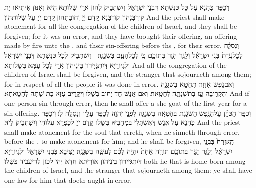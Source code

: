 {וִיכַפַּר כָּהֲנָא עַל כָּל כְּנִשְׁתָּא דִּבְנֵי יִשְׂרָאֵל וְיִשְׁתְּבֵיק לְהוֹן אֲרֵי שָׁלוּתָא הִיא וְאִנּוּן אֵיתִיאוּ יָת קוּרְבָּנְהוֹן קוּרְבָּנָא קֳדָם יְיָ וְחוֹבַתְהוֹן קֳדָם יְיָ עַל שָׁלוּתְהוֹן׃}
{And the priest shall make atonement for all the congregation of the children of Israel, and they shall be forgiven; for it was an error, and they have brought their offering, an offering made by fire unto the \lord, and their sin-offering before the \lord, for their error.}{}
{וְנִסְלַ֗ח לְכׇל\maqqaf עֲדַת֙ בְּנֵ֣י יִשְׂרָאֵ֔ל וְלַגֵּ֖ר הַגָּ֣ר בְּתוֹכָ֑ם כִּ֥י לְכׇל\maqqaf הָעָ֖ם בִּשְׁגָגָֽה׃ \setuma }
{וְיִשְׁתְּבֵיק לְכָל כְּנִשְׁתָּא דִּבְנֵי יִשְׂרָאֵל וּלְגִיּוֹרַיָּא דְּיִתְגַּיְּירוּן בֵּינֵיהוֹן אֲרֵי לְכָל עַמָּא בְּשָׁלוּתָא׃}
{And all the congregation of the children of Israel shall be forgiven, and the stranger that sojourneth among them; for in respect of all the people it was done in error.}{}
{וְאִם\maqqaf נֶ֥פֶשׁ אַחַ֖ת תֶּחֱטָ֣א בִשְׁגָגָ֑ה וְהִקְרִ֛יבָה עֵ֥ז בַּת\maqqaf שְׁנָתָ֖הּ לְחַטָּֽאת׃}
{וְאִם אֱנָשׁ חַד יְחוּב בְּשָׁלוּ וִיקָרֵיב עִזָּא בַּת שַׁתַּהּ לְחַטָּאתָא׃}
{And if one person sin through error, then he shall offer a she-goat of the first year for a sin-offering.}{}
{וְכִפֶּ֣ר הַכֹּהֵ֗ן עַל\maqqaf הַנֶּ֧פֶשׁ הַשֹּׁגֶ֛גֶת בְּחֶטְאָ֥ה בִשְׁגָגָ֖ה לִפְנֵ֣י יְהֹוָ֑ה לְכַפֵּ֥ר עָלָ֖יו וְנִסְלַ֥ח לֽוֹ׃}
{וִיכַפַּר כָּהֲנָא עַל אֱנָשׁ דְּאִשְׁתְּלִי בִּמְחָבֵיהּ בְּשָׁלוּ קֳדָם יְיָ לְכַפָּרָא עֲלוֹהִי וְיִשְׁתְּבֵיק לֵיהּ׃}
{And the priest shall make atonement for the soul that erreth, when he sinneth through error, before the \lord, to make atonement for him; and he shall be forgiven,}{}
{הָֽאֶזְרָח֙ בִּבְנֵ֣י יִשְׂרָאֵ֔ל וְלַגֵּ֖ר הַגָּ֣ר בְּתוֹכָ֑ם תּוֹרָ֤ה אַחַת֙ יִהְיֶ֣ה לָכֶ֔ם לָעֹשֶׂ֖ה בִּשְׁגָגָֽה׃}
{יַצִּיבָא בִּבְנֵי יִשְׂרָאֵל וּלְגִיּוֹרַיָּא דְּיִתְגַּיְּירוּן בֵּינֵיהוֹן אוֹרָיְתָא חֲדָא יְהֵי לְכוֹן לִדְיַעֲבֵיד בְּשָׁלוּ׃}
{both he that is home-born among the children of Israel, and the stranger that sojourneth among them: ye shall have one law for him that doeth aught in error.}{}

